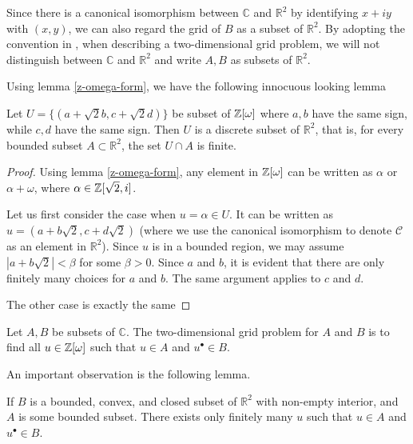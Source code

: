 Since there is a canonical isomorphism between $\mathbb{C}$ and $\mathbb{R}^2$ by identifying $x + iy$ with $(x, y)$, we can also regard the grid of $B$ as a subset of $\mathbb{R}^2$.
By adopting the convention in \cite{ross}, when describing a two-dimensional grid problem, we will not distinguish between $\mathbb{C}$ and $\mathbb{R}^2$ and write $A, B$ as subsets of $\mathbb{R}^2$.

Using lemma \ref{z-omega-form}, we have the following innocuous looking lemma

\begin{lemma}\label{discrete-grid}
	Let $U = \{(a + \sqrt{2} b, c + \sqrt{2} d)\}$ be subset of $\mathbb{Z}[\omega]$ where $a, b$ have the same sign, while $c, d$ have the same sign.
	Then $U$ is a discrete subset of $\mathbb{R}^2$, that is, for every bounded subset $A \subset \mathbb{R}^2$, the set $ U \cap A$ is finite.
\end{lemma}

\begin{proof}
	Using lemma \ref{z-omega-form}, any element in $\mathbb{Z}[\omega]$ can be written as $\alpha$ or $\alpha + \omega$, where $\alpha \in \mathbb{Z}[\sqrt{2} ,i]$.

	Let us first consider the case when $u = \alpha \in U$. 
	It can be written as $u = (a + b \sqrt{2}, c + d \sqrt{2})$ (where we use the canonical isomorphism to denote $\mathcal{C}$ as an element in $\mathbb{R}^2$).
	Since $u$ is in a bounded region, we may assume $|a + b\sqrt{2} | < \beta$ for some $\beta > 0$. Since $a$ and $b$, it is evident that there are only finitely many choices for $a$ and $b$.
	The same argument applies to $c$ and $d$. 

	The other case is exactly the same
\end{proof}

\begin{definition}
	Let $A, B$ be subsets of $\mathbb{C}$.
	The two-dimensional grid problem for $A$ and $B$ is to find all $u \in \mathbb{Z}[\omega]$ such that $u \in A$ and $u^{\bullet} \in B$.
\end{definition}


An important observation is the following lemma. 

\begin{lemma}\label{grid-solution}
	If $B$ is a bounded, convex, and closed subset of $\mathbb{R}^2$ with non-empty interior, and $A$ is some bounded subset.
	There exists only finitely many $u$ such that $u \in A$ and $u^{\bullet} \in B$.
\end{lemma}

